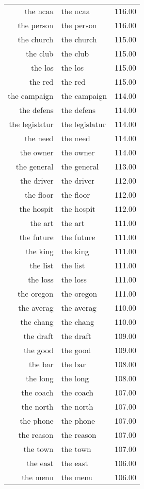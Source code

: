 \begin{table}[ht]
\begin{tabular}{rlr}
  the ncaa & the ncaa & 116.00 \\ 
  the person & the person & 116.00 \\ 
  the church & the church & 115.00 \\ 
  the club & the club & 115.00 \\ 
  the los & the los & 115.00 \\ 
  the red & the red & 115.00 \\ 
  the campaign & the campaign & 114.00 \\ 
  the defens & the defens & 114.00 \\ 
  the legislatur & the legislatur & 114.00 \\ 
  the need & the need & 114.00 \\ 
  the owner & the owner & 114.00 \\ 
  the general & the general & 113.00 \\ 
  the driver & the driver & 112.00 \\ 
  the floor & the floor & 112.00 \\ 
  the hospit & the hospit & 112.00 \\ 
  the art & the art & 111.00 \\ 
  the future & the future & 111.00 \\ 
  the king & the king & 111.00 \\ 
  the list & the list & 111.00 \\ 
  the loss & the loss & 111.00 \\ 
  the oregon & the oregon & 111.00 \\ 
  the averag & the averag & 110.00 \\ 
  the chang & the chang & 110.00 \\ 
  the draft & the draft & 109.00 \\ 
  the good & the good & 109.00 \\ 
  the bar & the bar & 108.00 \\ 
  the long & the long & 108.00 \\ 
  the coach & the coach & 107.00 \\ 
  the north & the north & 107.00 \\ 
  the phone & the phone & 107.00 \\ 
  the reason & the reason & 107.00 \\ 
  the town & the town & 107.00 \\ 
  the east & the east & 106.00 \\ 
  the menu & the menu & 106.00 \\ 

\end{tabular}
\end{table}
